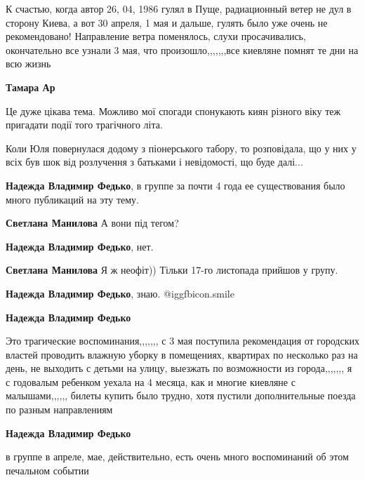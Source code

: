 \begin{itemize}

К счастью, когда автор 26, 04, 1986 гулял в Пуще, радиационный ветер не дул в
сторону Киева, а вот 30 апреля, 1 мая и дальше, гулять было уже очень не
рекомендовано! Направление ветра поменялось, слухи просачивались, окончательно
все узнали 3 мая, что произошло,,,,,,,все киевляне помнят те дни на всю жизнь

\begin{itemize} %
\textbf{Тамара Ар} 

Це дуже цікава тема. Можливо мої спогади спонукають киян різного віку теж
пригадати події того трагічного літа.

Коли Юля повернулася додому з піонерського табору, то розповідала, що у них у
всіх був шок від розлучення з батьками і невідомості, що буде далі...

\begin{itemize} %
\textbf{Надежда Владимир Федько}, в группе за почти 4 года ее существования было много публикаций на эту тему.

\textbf{Светлана Манилова} А вони під тегом?

\textbf{Надежда Владимир Федько}, нет.

\textbf{Светлана Манилова} Я ж неофіт)) Тільки 17-го листопада прийшов у групу.

\textbf{Надежда Владимир Федько}, знаю. @igg{fbicon.smile} 

\textbf{Надежда Владимир Федько} 

Это трагические воспоминания,,,,,,, с 3 мая поступила рекомендация от городских
властей проводить влажную уборку в помещениях, квартирах по несколько раз на
день, не выходить с детьми на улицу, выезжать по возможности из города,,,,,,, я
с годовалым ребенком уехала на 4 месяца, как и многие киевляне с
малышами,,,,,, билеты купить было трудно, хотя пустили дополнительные поезда по
разным направлениям


\textbf{Надежда Владимир Федько} 

в группе в апреле, мае, действительно, есть очень много воспоминаний об этом
печальном событии

\end{itemize} %

\end{itemize} %


\end{itemize}
